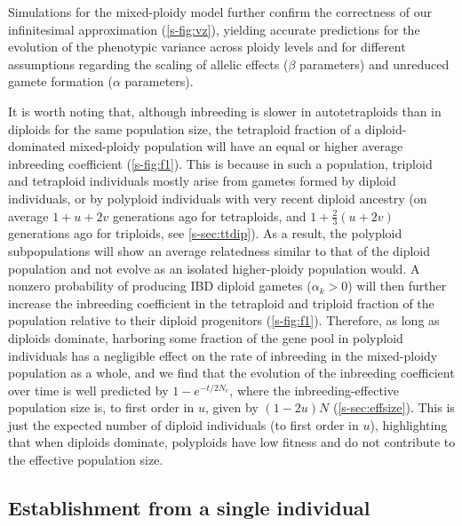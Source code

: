 \documentclass[12pt,a4paper]{article}
\begin{document}
Simulations for the mixed-ploidy model further confirm the correctness of our
infinitesimal approximation (\cref{s-fig:vz}), yielding accurate predictions
for the evolution of the phenotypic variance across ploidy levels and for
different assumptions regarding the scaling of allelic effects ($\beta$
parameters) and unreduced gamete formation ($\alpha$ parameters). 

It is worth noting that, although inbreeding is slower in autotetraploids than
in diploids for the same population size, the tetraploid fraction of a
diploid-dominated mixed-ploidy population will have an equal or higher average
inbreeding coefficient (\cref{s-fig:f1}).
This is because in such a population, triploid and tetraploid individuals
mostly arise from gametes formed by diploid individuals, or by polyploid
individuals with very recent diploid ancestry (on average $1+u+2v$ generations ago
for tetraploids, and $1+\frac{2}{3}(u+2v)$ generations ago for triploids, see
\cref{s-sec:ttdip}).
As a result, the polyploid subpopulations will show an average relatedness
similar to that of the diploid population and not evolve as an isolated
higher-ploidy population would.
A nonzero probability of producing IBD diploid gametes ($\alpha_k > 0$) will
then further increase the inbreeding coefficient in the tetraploid and triploid
fraction of the population relative to their diploid progenitors
(\cref{s-fig:f1}).
Therefore, as long as diploids dominate, harboring some fraction of the gene
pool in polyploid individuals has a negligible effect on the rate of inbreeding
in the mixed-ploidy population as a whole, and we find that the evolution of
the inbreeding coefficient over time is well predicted by $1-e^{-t/2N_e}$,
where the inbreeding-effective population size is, to first order in $u$, given
by $(1-2u)N$ (\cref{s-sec:effsize}). This is just the expected number of
diploid individuals (to first order in $u$), highlighting that when diploids
dominate, polyploids have low fitness and do not contribute to the effective
population size. 


\subsection*{Establishment from a single individual}
\end{document}
